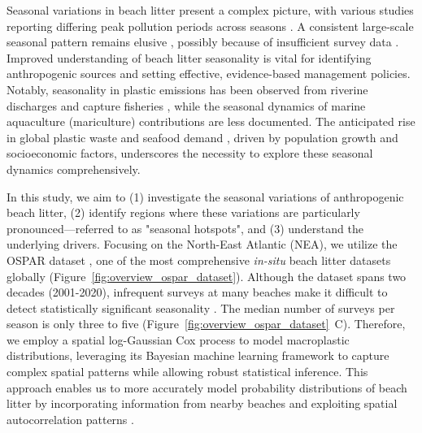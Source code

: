Seasonal variations in beach litter present a complex picture, with various studies reporting differing peak pollution periods across seasons \cite{gago_characteristics_2014,declerck_transport_2019,schulz_multi-criteria_2013,ruiz_modelling_2022,watts_through_2017,asensio-montesinos_seasonal_2019,ruiz_modelling_2022,rios_spatio-temporal_2018,williams_beach_2017}. A consistent large-scale seasonal pattern remains elusive \cite{schulz_multi-criteria_2013,nelms_marine_2017}, possibly because of insufficient survey data \cite{schulz_baseline_2019, haarr_global_2022}. Improved understanding of beach litter seasonality is vital for identifying anthropogenic sources and setting effective, evidence-based management policies. Notably, seasonality in plastic emissions has been observed from riverine discharges \cite{lebreton_river_2017,van_emmerik_seasonality_2019, van_emmerik_river_2023} and capture fisheries \cite{kroodsma_tracking_2018,paolo_satellite_2024}, while the seasonal dynamics of marine aquaculture (mariculture) contributions are less documented. The anticipated rise in global plastic waste and seafood demand \cite{lebreton_future_2019, fredheim_future_2018}, driven by population growth and socioeconomic factors, underscores the necessity to explore these seasonal dynamics comprehensively.

In this study, we aim to (1) investigate the seasonal variations of anthropogenic beach litter, (2) identify regions where these variations are particularly pronounced---referred to as "seasonal hotspots", and (3) understand the underlying drivers. Focusing on the North-East Atlantic (NEA), we utilize the OSPAR dataset \cite{ospar_comission_convention_1992}, one of the most comprehensive \textit{in-situ} beach litter datasets globally (Figure~\ref{fig:overview_ospar_dataset}). Although the dataset spans two decades (2001-2020), infrequent surveys at many beaches make it difficult to detect statistically significant seasonality \cite{schulz_multi-criteria_2013,schulz_baseline_2019,grundlehner_towards_2023}. The median number of surveys per season is only three to five (Figure~\ref{fig:overview_ospar_dataset}~C). Therefore, we employ a spatial log-Gaussian Cox process \cite{diggle_bivariate_1983,moller_log_1998} to model macroplastic distributions, leveraging its Bayesian machine learning framework to capture complex spatial patterns while allowing robust statistical inference. This approach enables us to more accurately model probability distributions of beach litter by incorporating information from nearby beaches and exploiting spatial autocorrelation patterns \cite{grundlehner_towards_2023}.

